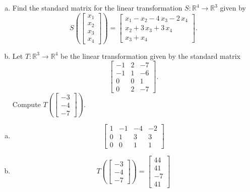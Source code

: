 
\begin{exerciseStatement}

\begin{enumerate}[(a)]
\item Find the standard matrix for the linear transformation \(S:\mathbb{R}^ 4  \to \mathbb{R}^ 3 \) given by \[S\left(  \left[\begin{array}{c}
x_{1} \\
x_{2} \\
x_{3} \\
x_{4}
\end{array}\right]  \right) =  \left[\begin{array}{c}
x_{1} - x_{2} - 4 \, x_{3} - 2 \, x_{4} \\
x_{2} + 3 \, x_{3} + 3 \, x_{4} \\
x_{3} + x_{4}
\end{array}\right] .\]
\item Let \(T:\mathbb{R}^ 3  \to \mathbb{R}^ 4 \) be the linear transformation given by the standard matrix \[ \left[\begin{array}{ccc}
-1 & 2 & -7 \\
-1 & 1 & -6 \\
0 & 0 & 1 \\
0 & 2 & -7
\end{array}\right] .\] Compute \(T\left( \left[\begin{array}{c}
-3 \\
-4 \\
-7
\end{array}\right]  \right)\). 
\end{enumerate}
    
\end{exerciseStatement}
    
\begin{exerciseAnswer} 

\begin{enumerate}[(a)]
\item \[ \left[\begin{array}{cccc}
1 & -1 & -4 & -2 \\
0 & 1 & 3 & 3 \\
0 & 0 & 1 & 1
\end{array}\right] \]
\item \[T\left( \left[\begin{array}{c}
-3 \\
-4 \\
-7
\end{array}\right]  \right)= \left[\begin{array}{c}
44 \\
41 \\
-7 \\
41
\end{array}\right] \]
\end{enumerate}
    
\end{exerciseAnswer}
    
